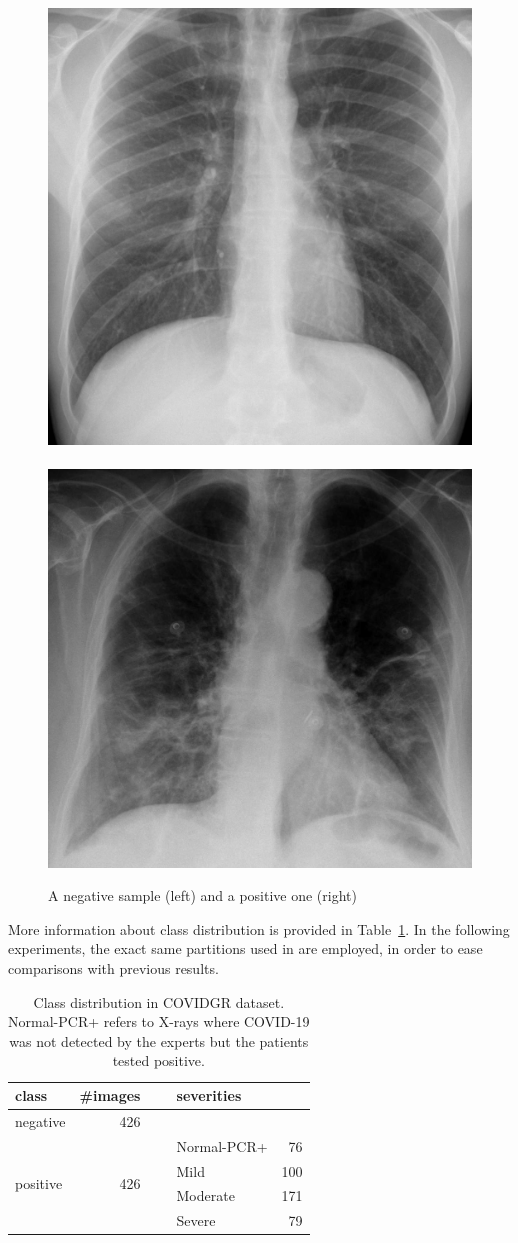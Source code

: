 \documentclass[
	fontsize=11pt, %
	twoside=false, %
	open=any, %
	secnumdepth=1, %
]{kaobook}
\begin{document}
\begin{figure}
    \centering
    \includegraphics[height=.33\linewidth]{Negativa-min.eps}~~
    \includegraphics[height=.33\linewidth]{Severa-min.eps}
    
    \caption{A negative sample (left) and a positive one (right)}
    \label{fig:covidgrsamples}
\end{figure}

More information about class distribution is provided in Table~\ref{tab:classdist}. In the following experiments, the exact same partitions used in \cite{9254002} are employed, in order to ease comparisons with previous results.


\begin{table}[htbp]
    \centering
    \begin{tabular}{lrllr}
    \toprule
        \bfseries class & \bfseries \#images &~ &\bfseries  severities \\
        \midrule
         negative & 426 && &\\\midrule
         \multirow{4}{*}{positive} & \multirow{4}{*}{426} && Normal-PCR+& 76\\
         &&& Mild& 100\\
         &&& Moderate& 171\\
         &&& Severe& 79\\
         \bottomrule
    \end{tabular}
    \caption{Class distribution in COVIDGR dataset. Normal-PCR+ refers to X-rays where COVID-19 was not detected by the experts but the patients tested positive.}
    \label{tab:classdist}
\end{table}
\end{document}
